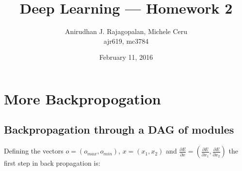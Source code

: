\documentclass{article}
\begin{document}
\title{Deep Learning --- Homework 2}
\date{February 11, 2016}
\author{Anirudhan J. Rajagopalan, Michele Ceru\\ ajr619, mc3784}

\maketitle

\newpage

\section[Expression for energy]{More Backpropogation}
\subsection{Backpropagation through a DAG of modules}
Defining the vectors $o=(o_{max},o_{min})$, $x=(x_1,x_2)$ and $\frac{\partial E}{\partial x} =(\frac{\partial E}{\partial x_1},\frac{\partial E}{\partial x_2}  )$ the first step in back propagation is:
\end{document}
